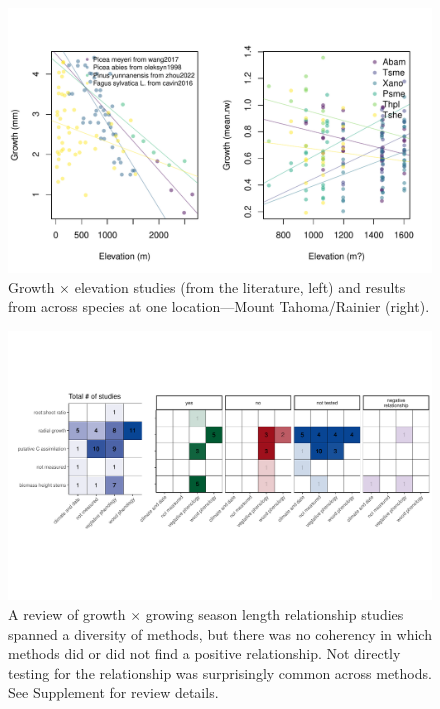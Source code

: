 \documentclass[11pt]{article}
\begin{document}
\begin{figure}[h!]
\includegraphics[width=1\textwidth]{..//analyses/growthxelevationetc/figures/growthxelev2part.pdf}
\caption{Growth $\times$ elevation studies (from the literature, left) and results from across species at one location---Mount Tahoma/Rainier (right).}
\label{fig:gxelev}
\end{figure}

\clearpage
\begin{figure}[h!]
\includegraphics[width=1\textwidth]{..//figures/heatmaps/combinedheatmap_gslxgrowth_simple.pdf}
\caption{A review of growth $\times$ growing season length relationship studies spanned a diversity of methods, but there was no coherency in which methods did or did not find a positive relationship. Not directly testing for the relationship was surprisingly common across methods. See Supplement for review details.}
\label{fig:heatmaps}
\end{figure}
\end{document}
